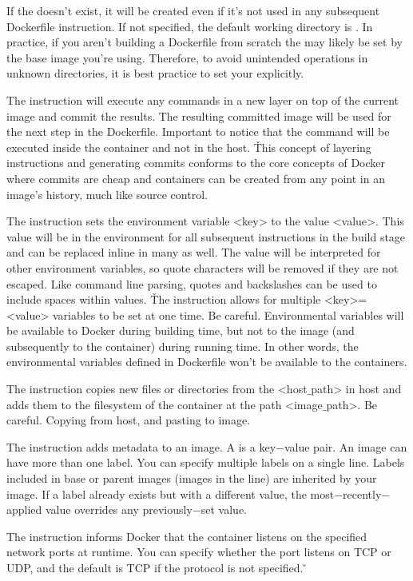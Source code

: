 If the  doesn't exist, it will be created even if it’s not used in any subsequent Dockerfile
instruction. If not specified, the default working directory is \code{/}. In practice, if you aren’t building a
Dockerfile from scratch the  may likely be set by the base image you’re using. Therefore, to avoid
unintended operations in unknown directories, it is best practice to set your  explicitly.
\item The  instruction will execute any commands in a new layer on top of the current image and commit the
results. The resulting committed image will be used for the next step in the Dockerfile. Important to notice that the
command will be executed inside the container and not in the host. \v

This concept of layering  instructions and generating commits conforms to the core concepts of Docker where
commits are cheap and containers can be created from any point in an image’s history, much like source control.
\item The  instruction sets the environment variable <key> to the value <value>. This value will be in the
environment for all subsequent instructions in the build stage and can be replaced inline in many as well. The value
will be interpreted for other environment variables, so quote characters will be removed if they are not escaped.
Like command line parsing, quotes and backslashes can be used to include spaces within values. \v

The  instruction allows for multiple <key>=<value> variables to be set at one time. Be careful.
Environmental variables will be available to Docker during building time, but not to the image (and subsequently to
the container) during running time. In other words, the environmental variables defined in Dockerfile won't be
available to the containers.
\item The  instruction copies new files or directories from the <host$\_$path> in host and adds them to
the filesystem of the container at the path <image$\_$path>. Be careful. Copying from host, and pasting to image.
\item The  instruction adds metadata to an image. A  is a key$-$value pair. An image can have
more than one label. You can specify multiple labels on a single line. Labels included in base or parent images
(images in the  line) are inherited by your image. If a label already exists but with a different value,
the most$-$recently$-$applied value overrides any previously$-$set value.
\item The  instruction informs Docker that the container listens on the specified network ports at
runtime. You can specify whether the port listens on TCP or UDP, and the default is TCP if the protocol is not
specified. \v

